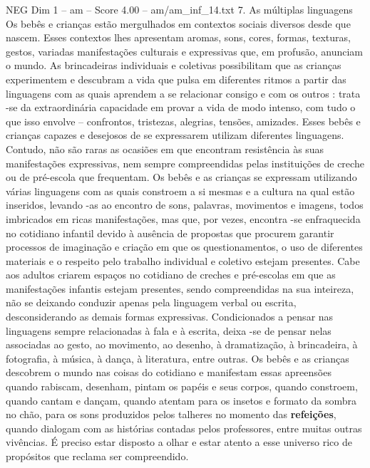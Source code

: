 \begin{textsample}{NEG Dim 1 – am – Score 4.00 – am/am\_inf\_14.txt}  \label{ex:f1_neg_069}
7.
As múltiplas linguagens Os bebês e crianças estão mergulhados em contextos sociais diversos desde que nascem.
Esses contextos lhes apresentam aromas, sons, cores, formas, texturas, gestos, variadas manifestações culturais e expressivas que, em profusão, anunciam o mundo.
As brincadeiras individuais e coletivas possibilitam que as crianças experimentem e descubram a vida que pulsa em diferentes ritmos a partir das linguagens com as quais aprendem a se relacionar consigo e com os outros : trata -se da extraordinária capacidade em provar a vida de modo intenso, com tudo o que isso envolve – confrontos, tristezas, alegrias, tensões, amizades.
Esses bebês e crianças capazes e desejosos de se expressarem utilizam diferentes linguagens.
Contudo, não são raras as ocasiões em que encontram resistência às suas manifestações expressivas, nem sempre compreendidas pelas instituições de creche ou de pré-escola que frequentam.
Os bebês e as crianças se expressam utilizando várias linguagens com as quais constroem a si mesmas e a cultura na qual estão inseridos, levando -as ao encontro de sons, palavras, movimentos e imagens, todos imbricados em ricas manifestações, mas que, por vezes, encontra -se enfraquecida no cotidiano infantil devido à ausência de propostas que procurem garantir processos de imaginação e criação em que os questionamentos, o uso de diferentes materiais e o respeito pelo trabalho individual e coletivo estejam presentes.
Cabe aos adultos criarem espaços no cotidiano de creches e pré-escolas em que as manifestações infantis estejam presentes, sendo compreendidas na sua inteireza, não se deixando conduzir apenas pela linguagem verbal ou escrita, desconsiderando as demais formas expressivas.
Condicionados a pensar nas linguagens sempre relacionadas à fala e à escrita, deixa -se de pensar nelas associadas ao gesto, ao movimento, ao desenho, à dramatização, à brincadeira, à fotografia, à música, à dança, à literatura, entre outras.
Os bebês e as crianças descobrem o mundo nas coisas do cotidiano e manifestam essas apreensões quando rabiscam, desenham, pintam os papéis e seus corpos, quando constroem, quando cantam e dançam, quando atentam para os insetos e formato da sombra no chão, para os sons produzidos pelos talheres no momento das \textbf{refeições}, quando dialogam com as histórias contadas pelos professores, entre muitas outras vivências.
É preciso estar disposto a olhar e estar atento a esse universo rico de propósitos que reclama ser compreendido.

\end{textsample}
